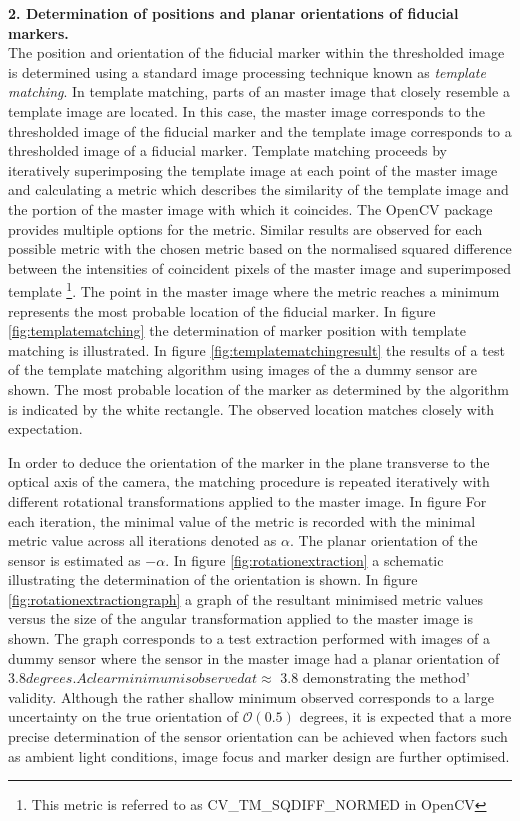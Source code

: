 \documentclass[fleqn,10pt]{SelfArx} %
\begin{document}
\textbf{2. Determination of positions and planar orientations of fiducial markers.}\\
The position and orientation of the fiducial marker within the thresholded image is determined using a standard image processing technique known as \emph{template matching}. In template matching, parts of an master image that closely resemble a template image are located. In this case, the master image corresponds to the thresholded image of the fiducial marker and the template image corresponds to a thresholded image of a fiducial marker. 
Template matching proceeds by iteratively superimposing the template image at each point of the master image and calculating a metric which describes the similarity of the template image and the portion of the master image with which it coincides. The OpenCV package provides multiple options for the metric. Similar results are observed for each possible metric with the chosen metric based on the normalised squared difference between the intensities of coincident pixels of the master image and superimposed template \footnote{This metric is referred to as CV\_TM\_SQDIFF\_NORMED in OpenCV}. The point in the master image where the metric reaches a minimum represents the most probable location of the fiducial marker. In figure \ref{fig:templatematching} the determination of marker position with template matching is illustrated. In figure \ref{fig:templatematchingresult} the results of a test of the template matching algorithm using images of the a dummy sensor are shown. The most probable location of the marker as determined by the algorithm is indicated by the white rectangle. The observed location matches closely with expectation.

In order to deduce the orientation of the marker in the plane transverse to the optical axis of the camera, the matching procedure is repeated iteratively with different rotational transformations applied to the master image. In figure  For each iteration, the minimal value of the metric is recorded with the minimal metric value across all iterations denoted as $\alpha$. The planar orientation of the sensor is estimated as $-\alpha$. In figure \ref{fig:rotationextraction} a schematic illustrating the determination of the orientation is shown. In figure \ref{fig:rotationextractiongraph} a graph of the resultant minimised metric values versus the size of the angular transformation applied to the master image is shown. The graph corresponds to a test extraction performed with images of a dummy sensor where the sensor in the master image had a planar orientation of \approx$ 3.8 degrees. A clear minimum is observed at \approx$ 3.8 demonstrating the method' validity. Although the rather shallow minimum observed corresponds to a large uncertainty on the true orientation of $\mathcal{O}(0.5)$ degrees, it is expected that a more precise determination of the sensor orientation can be achieved when factors such as ambient light conditions, image focus and marker design are further optimised.
\end{document}
